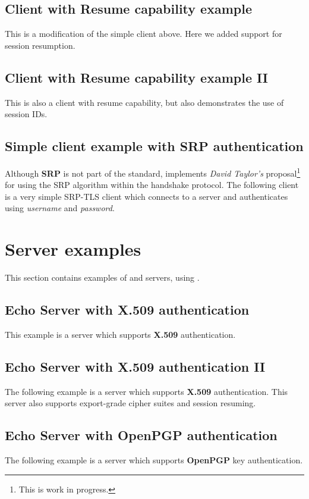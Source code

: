 \subsection{Client with Resume capability example}
\label{resume-example}
This is a modification of the simple client above. Here we added support 
for session resumption.


\subsection{Client with Resume capability example II}
\label{resume-example2}
This is also a client with resume capability, but also demonstrates
the use of session IDs.


\subsection{Simple client example with SRP authentication}
Although {\bf SRP} is not part of the \tls{} standard, \gnutls{} implements
{\it David Taylor's} proposal\footnote{This is work in progress.}  for using the SRP algorithm
within the \tls{} handshake protocol. The following client
is a very simple SRP-TLS client which connects to a server 
and authenticates using {\it username} and {\it password}.



\section{Server examples}
This section contains examples of \tls{} and \ssl{} servers, using \gnutls{}.

\subsection{Echo Server with X.509 authentication}
This example is a server which supports {\bf X.509} authentication.


\subsection{Echo Server with X.509 authentication II}
The following example is a server which supports {\bf X.509} authentication.
This server also supports export-grade cipher suites and session resuming.


\subsection{Echo Server with OpenPGP authentication}
The following example is a server which supports {\bf OpenPGP} key authentication.


